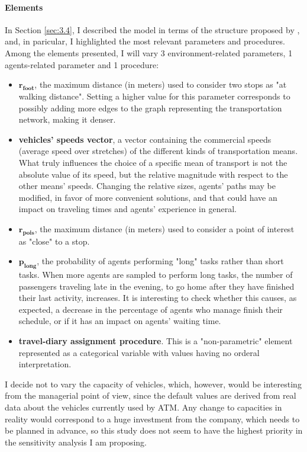 \paragraph{Elements}
In Section \ref{sec:3.4}, I described the model in terms of the structure proposed by \textcite{Borgonovo2022SensitivityAO}, and, in paricular, I highlighted the most relevant parameters and procedures. Among the elements presented, I will vary 3 environment-related parameters, 1 agents-related parameter and 1 procedure:
\begin{itemize}
    \item $\mathbf{r_{foot}}$, the maximum distance (in meters) used to consider two stops as "at walking distance". Setting a higher value for this parameter corresponds to possibly adding more edges to the graph representing the transportation network, making it denser.
    \item \textbf{vehicles' speeds vector}, a vector containing the commercial speeds (average speed over stretches) of the different kinds of transportation means. What truly influences the choice of a specific mean of transport is not the absolute value of its speed, but the relative magnitude with respect to the other means' speeds. Changing the relative sizes, agents' paths may be modified, in favor of more convenient solutions, and that could have an impact on traveling times and agents' experience in general.
    \item $\mathbf{r_{pois}}$, the maximum distance (in meters) used to consider a point of interest as "close" to a stop. 
    \item $\mathbf{p_{long}}$, the probability of agents performing "long" tasks rather than short tasks. When more agents are sampled to perform long tasks, the number of passengers traveling late in the evening, to go home after they have finished their last activity, increases. It is interesting to check whether this causes, as expected, a decrease in the percentage of agents who manage finish their schedule, or if it has an impact on agents' waiting time.
    \item \textbf{travel-diary assignment procedure}. This is a "non-parametric" element represented as a categorical variable with values having no orderal interpretation.
\end{itemize}
I decide not to vary the capacity of vehicles, which, however, would be interesting from the managerial point of view, since the default values are derived from real data about the vehicles currently used by ATM. Any change to capacities in reality would correspond to a huge investment from the company, which needs to be planned in advance, so this study does not seem to have the highest priority in the sensitivity analysis I am proposing.


